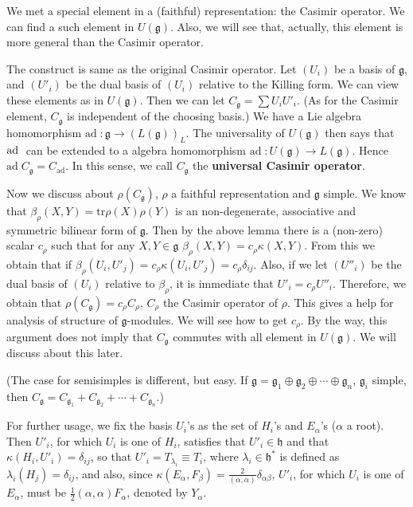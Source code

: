 \documentclass{article}
\newcommand{\tr}[1]{\mathrm{tr}#1}
\newcommand{\lie}[1]{\mathfrak{#1}}
\newcommand{\ad}[1]{\mathrm{ad}\; #1}
\begin{document}
We met a special element in a (faithful) representation: the Casimir operator.
We can find a such element in $U(\lie{g})$.
Also, we will see that, actually, this element is more general than the Casimir operator.

The construct is same as the original Casimir operator.
Let $(U_i)$ be a basis of $\lie{g}$, and $(U'_i)$ be the dual basis of $(U_i)$ relative to the Killing form.
We can view these elements as in $U(\lie{g})$.
Then we can let $C_\lie{g} = \sum U_i U'_i$.
(As for the Casimir element, $C_\lie{g}$ is independent of the choosing basis.)
We have a Lie algebra homomorphism $\ad : \lie{g} \to (L(\lie{g}))_L$.
The universality of $U(\lie{g})$ then says that $\ad$ can be extended to a algebra homomorphism $\ad : U(\lie{g}) \to L(\lie{g})$.
Hence $\ad{C_\lie{g}} = C_\textrm{ad}$.
In this sense, we call $C_\lie{g}$ the \textbf{universal Casimir operator}.

Now we discuss about $\rho(C_\lie{g})$, $\rho$ a faithful representation and $\lie{g}$ simple.
We know that $\beta_\rho(X, Y) = \tr{\rho(X)\rho(Y)}$ is an non-degenerate, associative and symmetric bilinear form of $\lie{g}$.
Then by the above lemma there is a (non-zero) scalar $c_\rho$ such that for any $X, Y \in \lie{g}$ $\beta_\rho(X, Y) = c_\rho \kappa(X, Y)$.
From this we obtain that if $\beta_\rho(U_i, U'_j) = c_\rho \kappa(U_i, U'_j) = c_\rho \delta_{ij}$.
Also, if we let $(U''_i)$ be the dual basis of $(U_i)$ relative to $\beta_\rho$, it is immediate that $U'_i = c_\rho U''_i$.
Therefore, we obtain that $\rho(C_\lie{g}) = c_\rho C_\rho$, $C_\rho$ the Casimir operator of $\rho$.
This gives a help for analysis of structure of $\lie{g}$-modules.
We will see how to get $c_\rho$.
By the way, this argument does not imply that $C_\lie{g}$ commutes with all element in $U(\lie{g})$.
We will discuss about this later.

(The case for semisimples is different, but easy.
If $\lie{g} = \lie{g}_1 \oplus \lie{g}_2 \oplus \cdots \oplus \lie{g}_n$, $\lie{g}_i$ simple, then $C_\lie{g} = C_{\lie{g}_1} + C_{\lie{g}_2} + \cdots + C_{\lie{g}_n}$.)

For further usage, we fix the basis $U_i$'s as the set of $H_i$'s and $E_\alpha$'s ($\alpha$ a root).
Then $U'_i$, for which $U_i$ is one of $H_i$, satisfies that $U'_i \in \lie{h}$ and that $\kappa(H_i, U'_i) = \delta_{ij}$, so that $U'_i = T_{\lambda_i} \equiv T_i$, where $\lambda_i \in \lie{h}^*$ is defined as $\lambda_i(H_j) = \delta_{ij}$, and also, since $\kappa(E_\alpha, F_\beta) = \frac{2}{(\alpha, \alpha)} \delta_{\alpha \beta}$, $U'_i$, for which $U_i$ is one of $E_\alpha$, must be $\frac{1}{2} (\alpha, \alpha) F_\alpha$, denoted by $Y_\alpha$.
\end{document}
